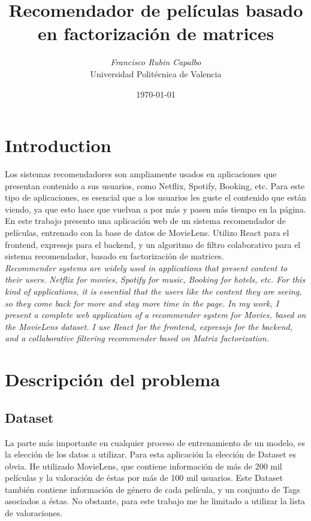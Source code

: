 \documentclass[a4paper, 11pt]{article}
\title{\Large{\textbf{Recomendador de películas basado en factorización de matrices}}}
\author{\textit{Francisco Rubin Capalbo}\\
		Universidad Politécnica de Valencia }
\date{\today}
\begin{document}
    
    \maketitle
    
    \section{Introduction}

\noindent Los sistemas recomendadores son ampliamente usados en aplicaciones que presentan contenido a sus usuarios, como Netflix, Spotify, Booking, etc. Para este tipo de aplicaciones, es esencial que a los usuarios les guste el contenido que están viendo, ya que esto hace que vuelvan a por más y pasen más tiempo en la página. En este trabajo presento una aplicación web de un sistema recomendador de películas, entrenado con la base de datos de MovieLens. Utilizo React para el frontend, expressjs para el backend, y un algoritmo de filtro colaborativo para el sistema recomendador, basado en factorización de matrices.  \\

\noindent \textit{Recommender systems are widely used in applications that present content to their users. Netflix for movies, Spotify for music, Booking for hotels, etc. For this kind of applications, it is essential that the users like the content they are seeing, so they come back for more and stay more time in the page. In my work, I present a complete web application of a recommender system for Movies, based on the MovieLens dataset. I use React for the frontend, expressjs for the backend, and a collaborative filtering recommender based on Matrix factorization.}



    \section{Descripción del problema}
    	\subsection{Dataset}
    	\noindent La parte más importante en cualquier proceso de entrenamiento de un modelo, es la elección de los datos a utilizar. Para esta aplicación la elección de Dataset es obvia. He utilizado MovieLens\cite{movielens}, que contiene información de más de 200 mil películas y la valoración de éstas por más de 100 mil usuarios. Este Dataset también contiene información de género de cada película, y un conjunto de Tags asociados a éstas. No obstante, para este trabajo me he limitado a utilizar la lista de valoraciones. \\
    	
\end{document}
